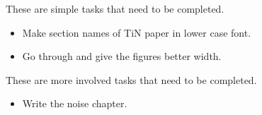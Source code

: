 These are simple tasks that need to be completed.
\begin{itemize}
    \item Make section names of TiN paper in lower case font.
    \item Go through and give the figures better width.
\end{itemize}

These are more involved tasks that need to be completed.
\begin{itemize}
    \item Write the noise chapter.
\end{itemize}

